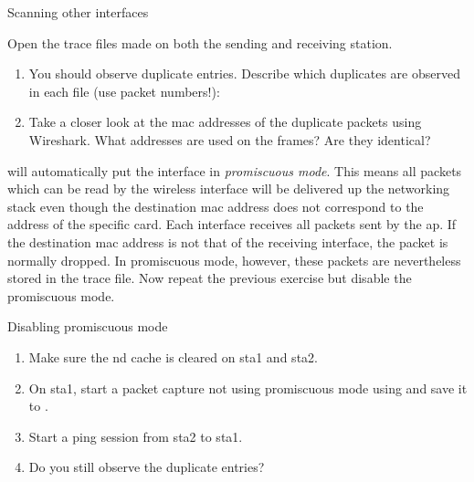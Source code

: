 \begin{exercise}{Scanning other interfaces}\label{ex:scan}

Open the trace files made on both the sending and receiving station.
	
	\begin{enumerate}
		\item You should observe duplicate entries. Describe which duplicates are observed in each file (use packet numbers!):\newline
		\begin{esolution}
		\end{esolution}
		\item Take a closer look at the \ac{mac} addresses of the duplicate packets using Wireshark. What addresses are used on the frames? Are they identical?\newline
		\begin{esolution}
		\end{esolution}
	\end{enumerate}
\end{exercise}

 will automatically put the interface in \emph{promiscuous mode}. This means all packets which can be read by the wireless interface will be delivered up the networking stack even though the destination \ac{mac} address does not correspond to the address of the specific card. Each interface receives all packets sent by the \ac{ap}. If the destination \ac{mac} address is not that of the receiving interface, the packet is normally dropped. In promiscuous mode, however, these packets are nevertheless stored in the trace file. Now repeat the previous exercise but disable the promiscuous mode.

\begin{exercise}{Disabling promiscuous mode}


\begin{enumerate}
	\item Make sure the \ac{nd} cache is cleared on \ac{sta}1 and \ac{sta}2. \newline 
	\item On \ac{sta}1, start a packet capture not using promiscuous mode using  and save it to .\newline
	\item Start a ping session from  \ac{sta}2 to \ac{sta}1. \newline
	\item Do you still observe the duplicate entries?\newline
	\begin{esolution}
	\end{esolution} 
\end{enumerate}
\end{exercise}

